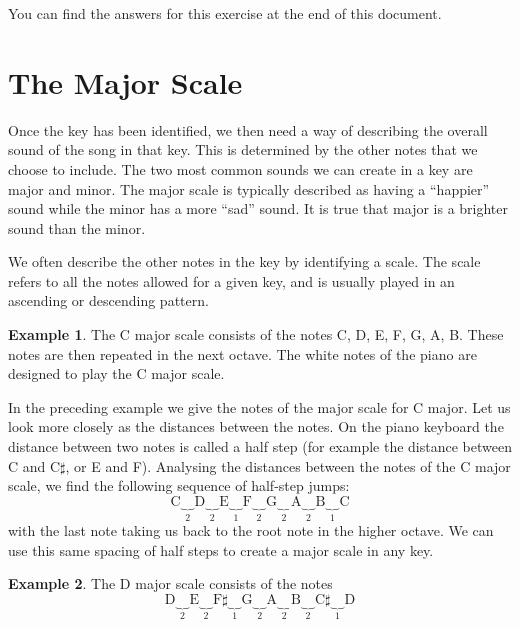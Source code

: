 \documentclass[12pt]{article}
\theoremstyle{definition}
\newtheorem*{example}{Example}
\begin{document}
You can find the answers for this exercise at the end of this document.

\newpage
\section{The Major Scale}
Once the key has been identified, we then need a way of describing the overall sound of the song in that key.
This is determined by the other notes that we choose to include. 
The two most common sounds we can create in a key are major and minor. 
The major scale is typically described as having a ``happier'' sound while the minor has a more ``sad'' sound. 
It is true that major is a brighter sound than the minor. 

We often describe the other notes in the key by identifying a scale. 
The scale refers to all the notes allowed for a given key, and is usually played in an ascending or descending pattern.

\begin{example}
The C major scale consists of the notes C, D, E, F, G, A, B. These notes are then repeated in the next octave. 
The white notes of the piano are designed to play the C major scale. 
\end{example}

In the preceding example we give the notes of the major scale for C major. 
Let us look more closely as the distances between the notes. 
On the piano keyboard the distance between two notes is called a half step (for example the distance between C and C$\sharp$, or E and F).
Analysing the distances between the notes of the C major scale, we find the following sequence of half-step jumps:
\[
\text{C} 
\underbrace{\quad}_{2} \text{D} 
\underbrace{\quad}_{2} \text{E} 
\underbrace{\quad}_{1} \text{F} 
\underbrace{\quad}_{2} \text{G} 
\underbrace{\quad}_{2} \text{A} 
\underbrace{\quad}_{2} \text{B} 
\underbrace{\quad}_{1} \text{C}
\]
with the last note taking us back to the root note in the higher octave. We can use this same spacing of half steps to create a major scale in any key.

\begin{example}
The D major scale consists of the notes 
\[
\text{D} 
\underbrace{\quad}_{2} \text{E} 
\underbrace{\quad}_{2} \text{F$\sharp$} 
\underbrace{\quad}_{1} \text{G} 
\underbrace{\quad}_{2} \text{A} 
\underbrace{\quad}_{2} \text{B} 
\underbrace{\quad}_{2} \text{C$\sharp$} 
\underbrace{\quad}_{1} \text{D}
\]
\end{example}
\end{document}
